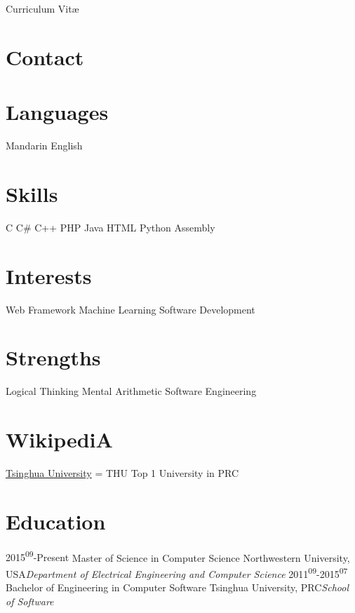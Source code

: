 \documentclass[]{Shidi-Zhao}
\begin{document}
       {Curriculum Vit\ae}
\begin{aside}
  \section{Contact}
\href{callto:2249993417}{}
\href{mailto:feiluo2015@u.northwestern.edu}{}
\href{www.luofei.cc}{}
\section{Languages}
\textbullet{} Mandarin
\textbullet{} English
\section{Skills}
\textbullet{} C 
\textbullet{} C\#
\textbullet{} C++ 
\textbullet{} PHP
\textbullet{} Java
\textbullet{} HTML 
\textbullet{} {\color{red} \faHeart}Python
\textbullet{} Assembly
\section{Interests}
\textbullet{} Web Framework
\textbullet{} Machine Learning
\textbullet{} Software Development
\section{Strengths}
\textbullet{} Logical Thinking
\textbullet{} Mental Arithmetic
\textbullet{} Software Engineering
\section{WikipediA}
\textbullet{} \href{https://en.wikipedia.org/wiki/Tsinghua_University}{Tsinghua University} = THU
Top 1 University in PRC
\end{aside}

\section{Education}
\begin{entrylist}
 \entry
    {2015\textsuperscript{09}-Present}
    {Master of Science in Computer Science}
    {Northwestern University, USA}{\emph{Department of Electrical Engineering and Computer Science}}
  \entry
    {2011\textsuperscript{09}-2015\textsuperscript{07}}
    {Bachelor of Engineering in Computer Software}
    {Tsinghua University, PRC}{\emph{School of Software}}
\end{entrylist}
\end{document}
